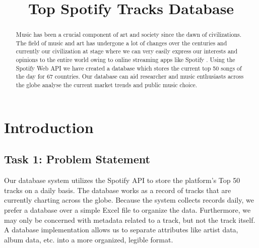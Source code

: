 \documentclass[conference]{IEEEtran}
\begin{document}
\title{Top Spotify Tracks Database}

\author{
\and
{}
\and
{}
}
\maketitle

\begin{abstract}
Music has been a crucial component of art and society since the dawn of civilizations. The field of music and art has undergone a lot of changes over the centuries and currently our civilization at stage where we can very easily express our interests and opinions to the entire world owing to online streaming apps like Spotify \cite{b2}. Using the Spotify Web API \cite{b1} we have created a database which stores the current top 50 songs of the day for 67 countries. Our database can aid researcher and music enthusiasts across the globe analyse the current market trends and public music choice.  
\end{abstract}

\section{Introduction}
\subsection{\textbf{Task 1}: Problem Statement}
Our database system utilizes the Spotify API \cite{b1} to store the platform’s Top 50 tracks on a daily basis. The database works as a record of tracks that are currently charting across the globe. Because the system collects records daily, we prefer a database over a simple Excel file to organize the data. Furthermore, we may only be concerned with metadata related to a track, but not the track itself. A database implementation allows us to separate attributes like artist data, album data, etc. into a more organized, legible format.
\end{document}
